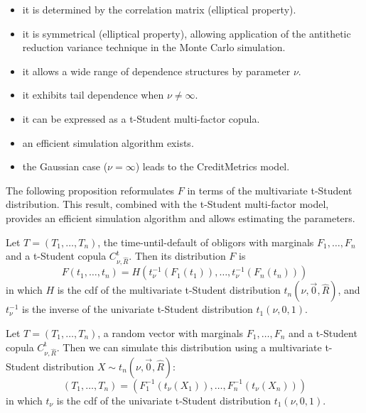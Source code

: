 \documentclass[11pt,fleqn]{book} %
\begin{document}
\begin{itemize}
	\item it is determined by the correlation matrix (elliptical property). 
	\item it is symmetrical (elliptical property), allowing application of the 
	antithetic reduction variance technique in the Monte Carlo simulation.
	\item it allows a wide range of dependence structures by parameter $\nu$.
	\item it exhibits tail dependence when $\nu \ne \infty$.
	\item it can be expressed as a t-Student multi-factor copula.
	\item an efficient simulation algorithm exists.
	\item the Gaussian case ($\nu = \infty$) leads to the 
	CreditMetrics\texttrademark{} model.
\end{itemize}

The following proposition reformulates $F$ in terms of the multivariate 
t-Student distribution. This result, combined with the t-Student multi-factor 
model, provides an efficient simulation algorithm and allows estimating the 
parameters.

\begin{proposition}
	\label{prop:dtd}
	Let $T=(T_1,\dots,T_n)$, the time-until-default of obligors with marginals 
	$F_1, \dots, F_n$ and a t-Student copula $C_{\nu,\widehat{R}}^{\text{t}}$. 
	Then its distribution $F$ is
	\begin{displaymath}
		F(t_1,\dots,t_n) = 
		H\left(t_\nu^{-1}(F_1(t_1)), \dots, t_\nu^{-1}(F_n(t_n))\right)
	\end{displaymath}
	in which $H$ is the cdf of the multivariate t-Student distribution 
	$t_n(\nu,\vec{0},\widehat{R})$, and $t_\nu^{-1}$ is the inverse of the 
	univariate t-Student distribution $t_1(\nu,0,1)$.
\end{proposition}

\begin{corollary}
	\label{cor:dts1}
	Let $T=(T_1, \dots, T_n)$, a random vector with marginals 
	$F_1, \dots, F_n$ and a t-Student copula $C_{\nu,\widehat{R}}^{\text{t}}$. 
	Then we can simulate this distribution using a multivariate t-Student 
	distribution $X \sim t_n(\nu,\vec{0},\widehat{R})$:
	\begin{displaymath}
		(T_1, \dots, T_n) = \left(
		F_1^{-1}\left(t_{\nu}(X_1)\right), \dots, F_n^{-1}\left(t_{\nu}(X_n)\right)
		\right)
	\end{displaymath}
	in which $t_\nu$ is the cdf of the univariate t-Student distribution 
	$t_1(\nu,0,1)$.
\end{corollary}
\end{document}
